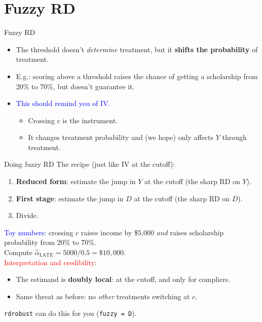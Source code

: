 \documentclass[handout,xcolor=dvipsnames]{beamer}
\begin{document}
\section{Fuzzy RD}

\begin{frame}{Fuzzy RD}
\small
\begin{itemize}
\item<1-> The threshold doesn't \textit{determine} treatment, but it \textbf{shifts the probability} of treatment.
\medskip
\item<2-> E.g.: scoring above a threshold raises the chance of getting a scholarship from 20\% to 70\%, but doesn't guarantee it.
\medskip
\item<3-> \textcolor{Blue}{This should remind you of IV.}
\smallskip
\begin{itemize}
\footnotesize
\item Crossing $c$ is the instrument.
\item It changes treatment probability and (we hope) only affects $Y$ through treatment.
\end{itemize}
\end{itemize}
\end{frame}


\begin{frame}{Doing fuzzy RD}
\small
{} The recipe (just like IV at the cutoff):
\begin{enumerate}
\footnotesize
  \item \textbf{Reduced form}: estimate the jump in $Y$ at the cutoff (the sharp RD on $Y$).
  \item \textbf{First stage}: estimate the jump in $D$ at the cutoff (the sharp RD on $D$).
  \item Divide.
\end{enumerate}
\medskip
{} \textcolor{Blue}{Toy numbers}: crossing $c$ raises income by \$5{,}000 \textit{and} raises scholarship probability from 20\% to 70\%. \\
\medskip
{} Compute $\hat{\alpha}_{\text{LATE}} = 5000 / 0.5 = \$10{,}000$.\\
\medskip
{} \textcolor{Red}{Interpretation and credibility}:
\begin{itemize}
\footnotesize
  \item The estimand is \textbf{doubly local}: at the cutoff, and only for compliers.
  \item Same threat as before: no \textit{other} treatments switching at $c$.
\end{itemize}
\medskip
{} \texttt{rdrobust} can do this for you (\texttt{fuzzy = D}).
\end{frame}
\end{document}
